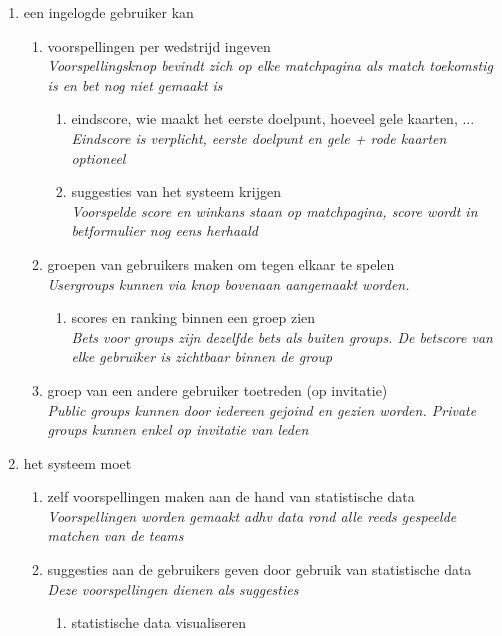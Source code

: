 \documentclass[11pt, a4paper]{article}
\begin{document}
\begin{enumerate}
\item een ingelogde gebruiker kan
\begin{enumerate}
\item voorspellingen per wedstrijd ingeven \\
\textit{Voorspellingsknop bevindt zich op elke matchpagina als match toekomstig is en bet nog niet gemaakt is}
\begin{enumerate}
\item eindscore, wie maakt het eerste doelpunt, hoeveel gele kaarten, ... \\
\textit{Eindscore is verplicht, eerste doelpunt en gele + rode kaarten optioneel}
\item suggesties van het systeem krijgen \\
\textit{Voorspelde score en winkans staan op matchpagina, score wordt in betformulier nog eens herhaald}
\end{enumerate}
\item groepen van gebruikers maken om tegen elkaar te spelen \\
\textit{Usergroups kunnen via knop bovenaan aangemaakt worden.}
\begin{enumerate}
\item scores en ranking binnen een groep zien \\
\textit{Bets voor groups zijn dezelfde bets als buiten groups. De betscore van elke gebruiker is zichtbaar binnen de group}
\end{enumerate}
\item groep van een andere gebruiker toetreden (op invitatie) \\
\textit{Public groups kunnen door iedereen gejoind en gezien worden. Private groups kunnen enkel op invitatie van leden}
\end{enumerate}
\item het systeem moet
\begin{enumerate}
\item zelf voorspellingen maken aan de hand van statistische data \\
\textit{Voorspellingen worden gemaakt adhv data rond alle reeds gespeelde matchen van de teams}
\item suggesties aan de gebruikers geven door gebruik van statistische data \\
\textit{Deze voorspellingen dienen als suggesties}
\begin{enumerate}
\item statistische data visualiseren \\

\end{enumerate}
\end{enumerate}
\end{enumerate}
\end{document}
